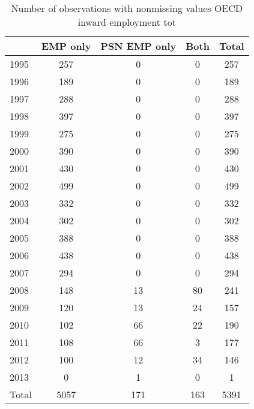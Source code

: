 \begin{table}[htbp]\centering
\caption{Number of observations with nonmissing values OECD inward employment tot}
\begin{tabular}{l*{4}{c}}
\toprule
            &    EMP only&PSN EMP only&        Both&       Total\\
\midrule
1995        &         257&           0&           0&         257\\
1996        &         189&           0&           0&         189\\
1997        &         288&           0&           0&         288\\
1998        &         397&           0&           0&         397\\
1999        &         275&           0&           0&         275\\
2000        &         390&           0&           0&         390\\
2001        &         430&           0&           0&         430\\
2002        &         499&           0&           0&         499\\
2003        &         332&           0&           0&         332\\
2004        &         302&           0&           0&         302\\
2005        &         388&           0&           0&         388\\
2006        &         438&           0&           0&         438\\
2007        &         294&           0&           0&         294\\
2008        &         148&          13&          80&         241\\
2009        &         120&          13&          24&         157\\
2010        &         102&          66&          22&         190\\
2011        &         108&          66&           3&         177\\
2012        &         100&          12&          34&         146\\
2013        &           0&           1&           0&           1\\
Total       &        5057&         171&         163&        5391\\
\bottomrule
\end{tabular}
\end{table}
